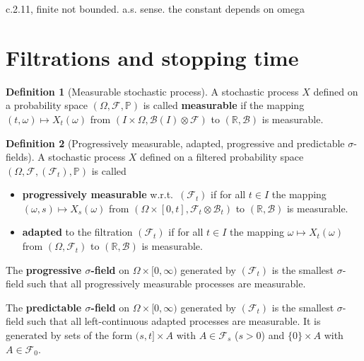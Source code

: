 \documentclass[a4paper,11pt]{book}
\theoremstyle{definition}
\newtheorem{definition}{Definition}[section]
\theoremstyle{remark}
\begin{document}
c.2.11, finite not bounded. a.s. sense. the constant depends on omega



\section{Filtrations and stopping time}

\begin{definition}[Measurable stochastic process]
	A stochastic process $X$ defined on a probability space $(\Omega, \mathcal{F}, \mathbb{P})$ is called \textbf{measurable} if the mapping $(t, \omega) \mapsto X_t(\omega)$ from $(I \times \Omega, \mathcal{B}(I) \otimes \mathcal{F})$ to $(\mathbb{R}, \mathcal{B})$ is measurable.
\end{definition}

\begin{definition}[Progressively measurable, adapted, progressive and predictable $\sigma$-fields]
	A stochastic process $X$ defined on a filtered probability space $(\Omega, \mathcal{F}, (\mathcal{F}_t), \mathbb{P})$ is called
	\begin{itemize}
		\item \textbf{progressively measurable} w.r.t.\ $(\mathcal{F}_t)$ if for all $t \in I$ the mapping $(\omega, s) \mapsto X_s(\omega)$ from $(\Omega \times [0,t], \mathcal{F}_t \otimes \mathcal{B}_t)$ to $(\mathbb{R}, \mathcal{B})$ is measurable.
		\item \textbf{adapted} to the filtration $(\mathcal{F}_t)$ if for all $t \in I$ the mapping $\omega \mapsto X_t(\omega)$ from $(\Omega, \mathcal{F}_t)$ to $(\mathbb{R}, \mathcal{B})$ is measurable.
	\end{itemize}

	The \textbf{progressive $\sigma$-field} on $\Omega \times [0, \infty)$ generated by $(\mathcal{F}_t)$ is the smallest $\sigma$-field such that all progressively measurable processes are measurable.

	The \textbf{predictable $\sigma$-field} on $\Omega \times [0, \infty)$ generated by $(\mathcal{F}_t)$ is the smallest $\sigma$-field such that all left-continuous adapted processes are measurable. It is generated by sets of the form $(s, t] \times A$ with $A \in \mathcal{F}_s$ ($s > 0$) and $\{0\} \times A$ with $A \in \mathcal{F}_0$.
\end{definition}
\end{document}
